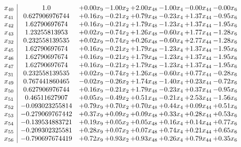 \documentclass[8pt]{article}
\begin{document}
\[\begin{array}{c| c c@{\hskip 2pt} c@{\hskip 2pt} c@{\hskip 2pt} c@{\hskip 2pt} c@{\hskip 2pt} c@{\hskip 2pt} }
 x_{40}   &  1.0 & +  0.00 x_{9} & -1.00 x_{2} & +  2.00 x_{48} & -1.00 x_{4} & -0.00 x_{44} & -0.00 x_{6}\\
 x_{41}   &  0.627906976744 & +  0.16 x_{9} & -0.21 x_{2} & +  0.79 x_{48} & -0.23 x_{4} & +  1.37 x_{44} & -0.95 x_{6}\\
 x_{42}   &  1.62790697674 & +  0.16 x_{9} & -0.21 x_{2} & +  1.79 x_{48} & -1.23 x_{4} & +  1.37 x_{44} & -1.95 x_{6}\\
 x_{43}   &  1.23255813953 & +  0.02 x_{9} & -0.74 x_{2} & +  1.26 x_{48} & -0.60 x_{4} & +  1.77 x_{44} & -1.28 x_{6}\\
 x_{32}   &  0.232558139535 & +  0.02 x_{9} & -0.74 x_{2} & +  0.26 x_{48} & -0.60 x_{4} & +  2.77 x_{44} & -1.28 x_{6}\\
 x_{45}   &  1.62790697674 & +  0.16 x_{9} & -0.21 x_{2} & +  1.79 x_{48} & -1.23 x_{4} & +  1.37 x_{44} & -1.95 x_{6}\\
 x_{46}   &  1.62790697674 & +  0.16 x_{9} & -0.21 x_{2} & +  1.79 x_{48} & -1.23 x_{4} & +  1.37 x_{44} & -1.95 x_{6}\\
 x_{47}   &  1.62790697674 & +  0.16 x_{9} & -0.21 x_{2} & +  1.79 x_{48} & -1.23 x_{4} & +  1.37 x_{44} & -1.95 x_{6}\\
 x_{31}   &  0.232558139535 & +  0.02 x_{9} & -0.74 x_{2} & +  1.26 x_{48} & -0.60 x_{4} & +  0.77 x_{44} & -0.28 x_{6}\\
 x_{49}   &  0.767441860465 & -0.02 x_{9} & -0.26 x_{2} & +  1.74 x_{48} & -1.40 x_{4} & +  0.23 x_{44} & -0.72 x_{6}\\
 x_{50}   &  0.627906976744 & +  0.16 x_{9} & -0.21 x_{2} & +  1.79 x_{48} & -0.23 x_{4} & +  0.37 x_{44} & -0.95 x_{6}\\
 x_{51}   &  0.46511627907 & +  0.05 x_{9} & -0.49 x_{2} & +  0.51 x_{48} & -0.21 x_{4} & +  2.53 x_{44} & -1.56 x_{6}\\
 x_{52}   &  -0.093023255814 & +  0.79 x_{9} & +  0.70 x_{2} & +  0.70 x_{48} & +  0.44 x_{4} & +  0.09 x_{44} & +  0.51 x_{6}\\
 x_{53}   &  -0.279069767442 & +  0.37 x_{9} & +  0.09 x_{2} & +  0.09 x_{48} & +  0.33 x_{4} & +  0.28 x_{44} & +  0.53 x_{6}\\
 x_{54}   &  -0.139534883721 & +  0.19 x_{9} & +  0.05 x_{2} & +  0.05 x_{48} & +  0.16 x_{4} & +  0.14 x_{44} & +  0.77 x_{6}\\
 x_{55}   &  -0.209302325581 & +  0.28 x_{9} & +  0.07 x_{2} & +  0.07 x_{48} & +  0.74 x_{4} & +  0.21 x_{44} & +  0.65 x_{6}\\
 x_{56}   &  -0.790697674419 & +  0.72 x_{9} & +  0.93 x_{2} & +  0.93 x_{48} & +  0.26 x_{4} & +  0.79 x_{44} & +  0.35 x_{6}\\

\end{array}\]
\end{document}
